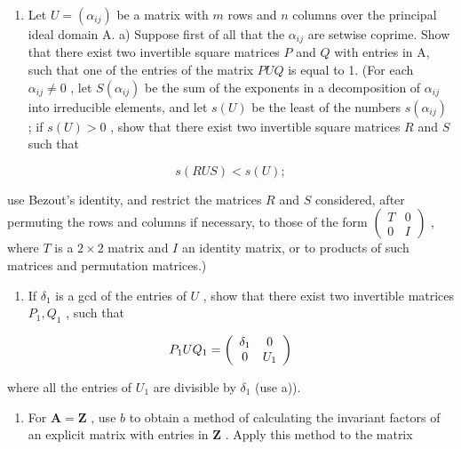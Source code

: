 \BourbakiExerciseGroup

\begin{enumerate}
\def\labelenumi{\arabic{enumi})}
\tightlist
\item
  Let \(U = (\alpha_{ij})\) be a matrix with \(m\) rows and \(n\) columns over the principal ideal domain A. a) Suppose first of all that the \(\alpha_{ij}\) are setwise coprime. Show that there exist two invertible square matrices \(P\) and \(Q\) with entries in A, such that one of the entries of the matrix \(PUQ\) is equal to 1. (For each \(\alpha_{ij} \neq 0\) , let \(S(\alpha_{ij})\) be the sum of the exponents in a decomposition of \(\alpha_{ij}\) into irreducible elements, and let \(s(U)\) be the least of the numbers \(s(\alpha_{ij})\) ; if \(s(U) > 0\) , show that there exist two invertible square matrices \(R\) and \(S\) such that
\end{enumerate}

\[
s (R U S) <   s (U);
\]

use Bezout's identity, and restrict the matrices \(R\) and \(S\) considered, after permuting the rows and columns if necessary, to those of the form \(\begin{pmatrix} T & 0 \\ 0 & I \end{pmatrix}\) , where \(T\) is a \(2 \times 2\) matrix and \(I\) an identity matrix, or to products of such matrices and permutation matrices.)

\begin{enumerate}
\def\labelenumi{\alph{enumi})}
\setcounter{enumi}{1}
\tightlist
\item
  If \(\delta_1\) is a gcd of the entries of \(U\) , show that there exist two invertible matrices \(P_1, Q_1\) , such that
\end{enumerate}

\[
P _ {1} U Q _ {1} = \left( \begin{array}{c c} \delta_ {1} & 0 \\ 0 & U _ {1} \end{array} \right)
\]

where all the entries of \(U_{1}\) are divisible by \(\delta_{1}\) (use a)).

\begin{enumerate}
\def\labelenumi{\alph{enumi})}
\setcounter{enumi}{2}
\tightlist
\item
  For \(\mathbf{A} = \mathbf{Z}\) , use \(b\) to obtain a method of calculating the invariant factors of an explicit matrix with entries in \(\mathbf{Z}\) . Apply this method to the matrix
\end{enumerate}

